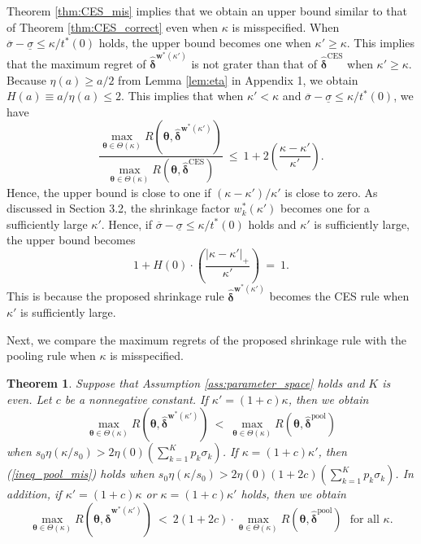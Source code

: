 \documentclass[12pt,a4paper]{article}
\newtheorem{Theorem}{Theorem}
\begin{document}
Theorem \ref{thm:CES_mis} implies that we obtain an upper bound similar to that of Theorem \ref{thm:CES_correct} even when $\kappa$ is misspecified. When $\overline{\sigma} - \underline{\sigma} \leq \kappa / t^{\ast}(0)$ holds, the upper bound becomes one when $\kappa' \geq \kappa$. This implies that the maximum regret of $\hat{\bm{\delta}}^{\bm{w}^{\ast}(\kappa')}$ is not grater than that of $\hat{\bm{\delta}}^{\mathrm{CES}}$ when $\kappa' \geq \kappa$. Because $\eta(a) \geq a/2$ from Lemma \ref{lem:eta} in Appendix 1, we obtain $H(a) \equiv a/\eta(a) \leq 2$. This implies that when $\kappa' < \kappa$ and $\overline{\sigma} - \underline{\sigma} \leq \kappa / t^{\ast}(0)$, we have
\[
\frac{\max_{\bm{\theta} \in \Theta(\kappa)} R(\bm{\theta},\hat{\bm{\delta}}^{\bm{w}^{\ast}(\kappa')})}{\max_{\bm{\theta} \in \Theta(\kappa)} R(\bm{\theta},\hat{\bm{\delta}}^{\mathrm{CES}})} \ \leq \ 1 + 2 \left( \frac{ \kappa - \kappa'}{\kappa'} \right).
\]
Hence, the upper bound is close to one if $(\kappa - \kappa')/\kappa'$ is close to zero. As discussed in Section 3.2, the shrinkage factor $w_k^{\ast}(\kappa')$ becomes one for a sufficiently large $\kappa'$. Hence, if $\overline{\sigma} - \underline{\sigma} \leq \kappa / t^{\ast}(0)$ holds and $\kappa'$ is sufficiently large, the upper bound becomes
\[
1 + H(0) \cdot \left( \frac{|\kappa - \kappa'|_{+}}{\kappa'} \right) \ = \ 1.
\]
This is because the proposed shrinkage rule $\hat{\bm{\delta}}^{\bm{w}^{\ast}(\kappa')}$ becomes the CES rule when $\kappa'$ is sufficiently large.
\fi

Next, we compare the maximum regrets of the proposed shrinkage rule with the pooling rule when $\kappa$ is misspecified.

\begin{Theorem}\label{thm:pool_mis}
Suppose that Assumption \ref{ass:parameter_space} holds and $K$ is even.  Let $c$ be a nonnegative constant. If $\kappa' = (1+c)\kappa$, then we obtain
\begin{equation}
\max_{\bm{\theta} \in \Theta(\kappa)} R(\bm{\theta},\hat{\bm{\delta}}^{\bm{w}^{\ast}(\kappa')}) \ < \ \max_{\bm{\theta} \in \Theta(\kappa)} R(\bm{\theta},\hat{\bm{\delta}}^{\mathrm{pool}}) \label{ineq_pool_mis}
\end{equation}
when $s_0 \eta(\kappa / s_0) > 2 \eta(0) \left( \sum_{k=1}^K p_k \sigma_k \right)$. If $\kappa = (1+c)\kappa'$, then (\ref{ineq_pool_mis}) holds when $s_0 \eta(\kappa / s_0) > 2 \eta(0) (1+2c) \left( \sum_{k=1}^K p_k \sigma_k \right)$.
In addition, if $\kappa' = (1+c)\kappa$ or $\kappa = (1+c)\kappa'$ holds, then we obtain
\begin{equation}
\max_{\bm{\theta} \in \Theta(\kappa)} R(\bm{\theta},\hat{\bm{\delta}}^{\bm{w}^{\ast}(\kappa')}) \ < \ 2(1+2c) \cdot \max_{\bm{\theta} \in \Theta(\kappa)} R(\bm{\theta},\hat{\bm{\delta}}^{\mathrm{pool}}) \ \ \ \text{for all $\kappa$.}\nonumber
\end{equation}
\end{Theorem}
\end{document}
